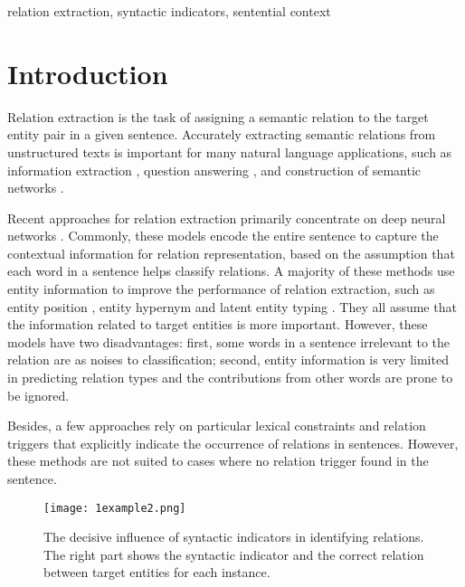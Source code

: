\documentclass[conference]{IEEEtran}
\begin{document}
\begin{IEEEkeywords}
relation extraction, syntactic indicators, sentential context
\end{IEEEkeywords}

\section{Introduction}

Relation extraction is the task of assigning a semantic relation to the target entity pair in a given sentence. Accurately extracting semantic relations from unstructured texts is important for many natural language applications, such as information extraction \cite{fader2011identifying}\cite{wu2010open}, question answering \cite{fan2005using}\cite{yih2014semantic}, and construction of semantic networks \cite{miller1991semantic}\cite{vossen1998multilingual}. 

Recent approaches for relation extraction primarily concentrate on deep neural networks \cite{zeng2014relation, dos2015classifying, zhang2015bidirectional, zhou2016attention, xiao2016semantic, huang2016attention}. Commonly, these models encode the entire sentence to capture the contextual information for relation representation, based on the assumption that each word in a sentence helps classify relations. A majority of these methods use entity information to improve the performance of relation extraction, such as entity position \cite{zeng2014relation}\cite{dos2015classifying}, entity hypernym \cite{zeng2014relation} and latent entity typing \cite{lee2019semantic}. They all assume that the information related to target entities is more important. However, these models have two disadvantages: 
first, some words in a sentence irrelevant to the relation are as noises to classification;
second, entity information is very limited in predicting relation types and the contributions from other words are prone to be ignored. 

Besides, a few approaches rely on particular lexical constraints \cite{fader2014open} and relation triggers \cite{bjorne2011extracting} that explicitly indicate the occurrence of relations in sentences. However, these methods are not suited to cases where no relation trigger found in the sentence.

\begin{figure}[t]
\centerline{\texttt{[image: 1example2.png]}}
\caption{The decisive influence of syntactic indicators in identifying relations. The right part shows the syntactic indicator and the correct relation between target entities for each instance.}
\label{fig:1example}
\end{figure}
\end{document}
